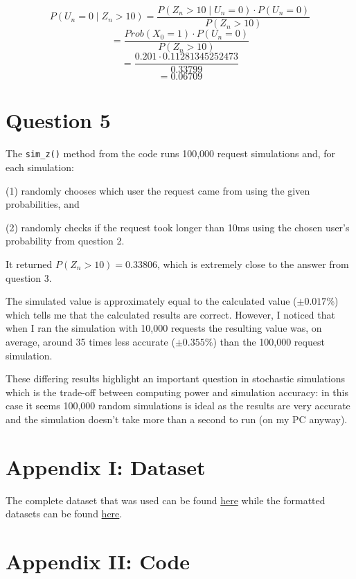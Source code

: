 \documentclass[12pt]{article}
\begin{document}
$$P(U_n = 0 \mid Z_n > 10) = \frac{P(Z_n > 10 \mid U_n = 0) \cdot P(U_n = 0)}{P(Z_n > 10)}$$
$$= \frac{Prob(X_0 = 1) \cdot P(U_n = 0)}{P(Z_n > 10)}$$
$$= \frac{0.201 \cdot 0.11281345252473}{0.33799}$$
$$= 0.06709$$

\section*{Question 5}

\noindent The \texttt{sim\_z()} method from the code runs 100,000 request simulations and, for each simulation:

\indent (1) randomly chooses which user the request came from using the given probabilities, and

\indent (2) randomly checks if the request took longer than 10ms using the chosen user's probability from question 2.

\noindent It returned $P(Z_n > 10) = 0.33806$, which is extremely close to the answer from question 3.

\indent The simulated value is approximately equal to the calculated value ($\pm0.017\%$) which tells me that the calculated results are correct. However, I noticed that when I ran the simulation with 10,000 requests the resulting value was, on average, around 35 times less accurate ($\pm0.355\%$) than the 100,000 request simulation.

\indent These differing results highlight an important question in stochastic simulations which is the trade-off between computing power and simulation accuracy: in this case it seems 100,000 random simulations is ideal as the results are very accurate and the simulation doesn't take more than a second to run (on my PC anyway).

\section*{Appendix I: Dataset}

\noindent The complete dataset that was used can be found \href{https://raw.githubusercontent.com/conormccauley1999/College/master/ST3009\%20-\%20Statistical\%20Methods\%20for\%20Computer\%20Science/Mid-Term\%20Assignment/dataset_raw.txt}{here} while the formatted datasets can be found \href{https://github.com/conormccauley1999/College/tree/master/ST3009\%20-\%20Statistical\%20Methods\%20for\%20Computer\%20Science/Mid-Term\%20Assignment}{here}. 

\section*{Appendix II: Code}
\end{document}
